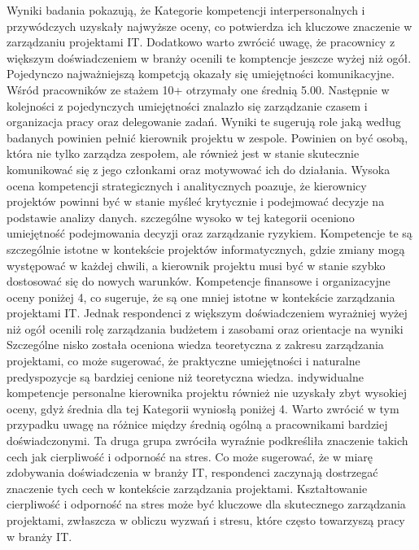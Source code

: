 Wyniki badania pokazują, że Kategorie kompetencji interpersonalnych i przywódczych uzyskały najwyższe oceny, co potwierdza ich kluczowe znaczenie w zarządzaniu projektami IT. Dodatkowo warto zwrócić uwagę, że pracownicy z większym doświadczeniem w branży ocenili te komptencje jeszcze wyżej niż ogół. Pojedynczo najważniejszą kompetcją okazały się umiejętności komunikacyjne. Wśród pracowników ze stażem 10+ otrzymały one średnią 5.00. Następnie w kolejności z pojedynczych umiejętności znalazło się zarządzanie czasem i organizacja pracy oraz delegowanie zadań. Wyniki te sugerują role jaką według badanych powinien pełnić kierownik projektu w zespole. Powinien on być osobą, która nie tylko zarządza zespołem, ale również jest w stanie skutecznie komunikować się z jego członkami oraz motywować ich do działania. Wysoka ocena kompetencji strategicznych i analitycznych poazuje, że kierownicy projektów powinni być w stanie myśleć krytycznie i podejmować decyzje na podstawie analizy danych. szczególne wysoko w tej kategorii oceniono umiejętność podejmowania decyzji oraz zarządzanie ryzykiem. Kompetencje te są szczególnie istotne w kontekście projektów informatycznych, gdzie zmiany mogą występować w każdej chwili, a kierownik projektu musi być w stanie szybko dostosować się do nowych warunków.
Kompetencje finansowe i organizacyjne oceny poniżej 4, co sugeruje, że są one mniej istotne w kontekście zarządzania projektami IT. Jednak respondenci z większym doświadczeniem wyrażniej wyżej niż ogół ocenili rolę zarządzania budżetem i zasobami oraz orientacje na wyniki Szczególne nisko została oceniona wiedza teoretyczna z zakresu zarządzania projektami, co może sugerować, że praktyczne umiejętności i naturalne predyspozycje są bardziej cenione niż teoretyczna wiedza.
indywidualne kompetencje personalne kierownika projektu również nie uzyskały zbyt wysokiej oceny, gdyż średnia dla tej Kategorii wyniosłą poniżej 4. Warto zwrócić w tym przypadku uwagę na różnice między średnią ogólną a pracownikami bardziej doświadczonymi. Ta druga grupa zwróciła wyraźnie podkreśliła znaczenie takich cech jak cierpliwość i odporność na stres. Co może sugerować, że w miarę zdobywania doświadczenia w branży IT, respondenci zaczynają dostrzegać znaczenie tych cech w kontekście zarządzania projektami. Kształtowanie cierpliwość i odporność na stres może być kluczowe dla skutecznego zarządzania projektami, zwłaszcza w obliczu wyzwań i stresu, które często towarzyszą pracy w branży IT.
